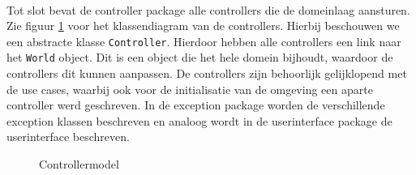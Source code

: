 \paragraph{}
Tot slot bevat de controller package alle controllers die de domeinlaag aansturen. Zie figuur \ref{controller} voor het klassendiagram van de controllers.
Hierbij beschouwen we een abstracte klasse \verb+Controller+. Hierdoor hebben alle controllers een link naar het \verb+World+ object.
Dit is een object die het hele domein bijhoudt, waardoor de controllers dit kunnen aanpassen.
De controllers zijn behoorlijk gelijklopend met de use cases, waarbij ook voor de initialisatie van de omgeving een aparte controller werd geschreven.
In de exception package worden de verschillende exception klassen beschreven en analoog wordt in de userinterface package de userinterface beschreven.
\begin{figure}[H]
    \centering
    \caption{Controllermodel}
    \label{controller}
\end{figure}